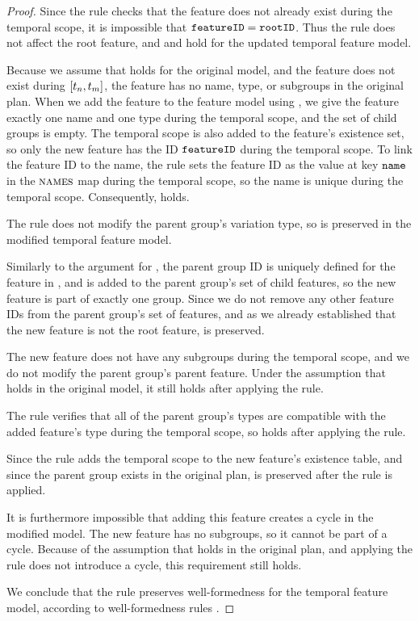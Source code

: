 \begin{proof}
Since the rule checks that the feature does not already exist during the temporal scope, it is impossible that $\texttt{featureID} = \texttt{rootID}$. Thus the rule does not affect the root feature, and  and  hold for the updated temporal feature model.

Because we assume that  holds for the original model, and the feature does not exist during $\interval{t_n}{t_m}$, the feature has no name, type, or subgroups in the original plan. When we add the feature to the feature model using , we give the feature exactly one name and one type during the temporal scope, and the set of child groups is empty. The temporal scope is also added to the feature's existence set, so only the new feature has the ID $\texttt{featureID}$ during the temporal scope. To link the feature ID to the name, the rule sets the feature ID as the value at key $\texttt{name}$ in the $\textsc{names}{}$ map during the temporal scope, so the name is unique during the temporal scope.
Consequently,  holds.

The rule does not modify the parent group's variation type, so  is preserved in the modified temporal feature model.

Similarly to the argument for , the parent group ID is uniquely defined for the feature in , and  is added to the parent group's set of child features, so the new feature is part of exactly one group. Since we do not remove any other feature IDs from the parent group's set of features, and as we already established that the new feature is not the root feature,  is preserved.

The new feature does not have any subgroups during the temporal scope, and we do not modify the parent group's parent feature. Under the assumption that  holds in the original model, it still holds after applying the  rule.

The rule verifies that all of the parent group's types are compatible with the added feature's type during the temporal scope, so  holds after applying the rule.

Since the rule adds the temporal scope to the new feature's existence table, and since the parent group exists in the original plan,  is preserved after the rule is applied.

It is furthermore impossible that adding this feature creates a cycle in the modified model. The new feature has no subgroups, so it cannot be part of a cycle. Because of the assumption that  holds in the original plan, and applying the rule does not introduce a cycle, this requirement still holds. 

We conclude that the  rule preserves well-formedness for the temporal feature model, according to well-formedness rules .
\end{proof}

